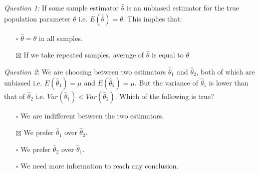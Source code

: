 \documentclass{./../../Latex/handout}
\begin{document}
\thispagestyle{plain}

 \\~\\

\textit{Question 1:} If some sample estimator $\hat{\theta}$ is an unbiased estimator for the true population parameter $\theta$ i.e. $E(\hat{\theta}) = \theta$. This implies that: \vspace{-1em}
\begin{itemize}
\item[$\square$] $\hat{\theta}=\theta$ in all samples.
\item[$\boxtimes$] If we take repeated samples, average of $\hat{\theta}$ is equal to $\theta$ \\
\end{itemize}

\textit{Question 2}: We are choosing between two estimators $\hat{\theta}_1$ and $\hat{\theta}_2$, both of which are unbiased i.e. $E(\hat{\theta}_1)=\mu$ and $E(\hat{\theta}_2)=\mu$. But the variance of $\hat{\theta}_1$ is lower than that of $\hat{\theta}_2$ i.e. $Var(\hat{\theta}_1)<Var(\hat{\theta}_2)$.  Which of the following is true? \vspace{-1em}
\begin{itemize}
\item[$\square$] We are indifferent between the two estimators.
\item[$\boxtimes$] We prefer $\hat{\theta}_1$ over $\hat{\theta}_2$.
\item[$\square$] We prefer $\hat{\theta}_2$ over $\hat{\theta}_1$.
\item[$\square$] We need more information to reach any conclusion. \\~\\
\end{itemize}
\end{document}
